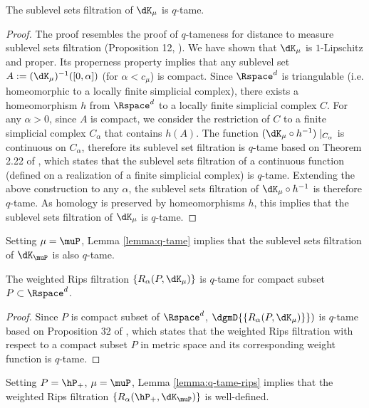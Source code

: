 \documentclass[11pt]{myclass}
\begin{document}
\begin{lemma}
The sublevel sets filtration of $\dK_\mu$ is $q$-tame. 
\label{lemma:q-tame}
\end{lemma}
\begin{proof}
The proof resembles the proof of $q$-tameness for distance to measure sublevel sets filtration (Proposition 12, \cite{BuchetChazalOudot2013}). 
We have shown that $\dK_\mu$ is $1$-Lipschitz and proper. Its properness property implies that any sublevel set $A:=(\dK_\mu)^{-1}([0,\alpha])$ (for $\alpha < c_\mu$) is compact. 
Since $\Rspace^d$ is triangulable (i.e. homeomorphic to a locally finite simplicial complex), there exists a homeomorphism $h$ from $\Rspace^d$ to a locally finite simplicial complex $C$. 
For any $\alpha > 0$, since $A$ is compact, we consider the restriction of $C$ to a finite simplicial complex $C_{\alpha}$ that contains $h(A)$. 
The function $(\dK_\mu \circ h^{-1})\mid_{C_{\alpha}}$ is continuous on $C_{\alpha}$, 
therefore its sublevel set filtration is $q$-tame based on 
Theorem 2.22 of \cite{ChazalSilvaGlisse2013}, which states that the sublevel sets filtration of a continuous function (defined on a realization of a finite simplicial complex) is $q$-tame. 
Extending the above construction to any $\alpha$, the sublevel sets filtration of $\dK_\mu \circ h^{-1}$ is therefore $q$-tame. 
As homology is preserved by homeomorphisms $h$, this implies that the sublevel sets filtration of $\dK_{\mu}$ is $q$-tame. 
\end{proof}

Setting $\mu = \muP$, Lemma \ref{lemma:q-tame} implies that the sublevel sets filtration of $\dK_\muP$ is also $q$-tame. 

\begin{lemma}
The weighted Rips filtration $\{R_{\alpha}(P,\dK_\mu)\}$ is $q$-tame for compact subset $P \subset \Rspace^d$. 
\label{lemma:q-tame-rips}
\end{lemma}
\begin{proof}
Since $P$ is compact subset of $\Rspace^d$, $\dgmD{\{R_{\alpha}(P,\dK_\mu)\}})$ is $q$-tame based on Proposition 32 of \cite{ChazalSilvaGlisse2013}, which states that the weighted Rips filtration with respect to a compact subset $P$ in metric space and its corresponding weight function is $q$-tame. 
\end{proof}

Setting $P = \hP_+$, $\mu = \muP$, Lemma \ref{lemma:q-tame-rips} implies that the weighted Rips filtration $\{R_{\alpha}(\hP_+,\dK_\muP)\}$ is well-defined. 
\end{document}
